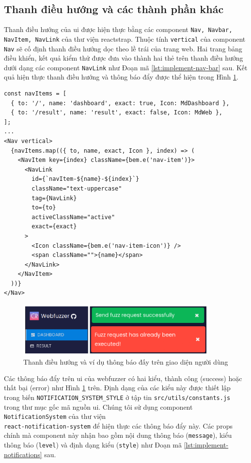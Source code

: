\subsection{Thanh điều hướng và các thành phần khác}
Thanh điều hướng của \acrshort{ui} được hiện thực bằng các component \texttt{Nav, Navbar, NavItem, NavLink} của thư viện reactstrap. Thuộc tính \texttt{vertical} của component \texttt{Nav} sẽ cố định thanh điều hướng dọc theo lề trái của trang web. Hai trang bảng điều khiển, kết quả kiểm thử được đưa vào thành hai thẻ trên thanh điều hướng dưới dạng các component \texttt{NavLink} như Đoạn mã \ref{lst:implement-nav-bar} sau. Kết quả hiện thực thanh điều hướng và thông báo đẩy được thể hiện trong Hình \ref{fig:notification-example}.
\begin{lstlisting}[style=ES6, label={lst:implement-nav-bar}, caption={Các thuộc tính props truyền vào component Nav}]
const navItems = [
  { to: '/', name: 'dashboard', exact: true, Icon: MdDashboard },
  { to: '/result', name: 'result', exact: false, Icon: MdWeb },
];
...
<Nav vertical>
  {navItems.map(({ to, name, exact, Icon }, index) => (
    <NavItem key={index} className={bem.e('nav-item')}>
      <NavLink
        id={`navItem-${name}-${index}`}
        className="text-uppercase"
        tag={NavLink}
        to={to}
        activeClassName="active"
        exact={exact}
      >
        <Icon className={bem.e('nav-item-icon')} />
        <span className="">{name}</span>
      </NavLink>
    </NavItem>
  ))}
</Nav>
\end{lstlisting}
\begin{figure}[H]
  \centering
    \includegraphics[width=0.9\textwidth,keepaspectratio=true]{images/notification-example.png}
  \caption{Thanh điều hướng và ví dụ thông báo đấy trên giao diện người dùng}
  \label{fig:notification-example}
\end{figure}
Các thông báo đẩy trên \acrshort{ui} của webfuzzer có hai kiểu, thành công (success) hoặc thất bại (error) như Hình \ref{fig:notification-example} trên. Định dạng của các kiểu này được thiết lập trong biến \texttt{NOTIFICATION\_SYSTEM\_STYLE} ở tập tin \texttt{src/utils/constants.js} trong thư mục gốc mã nguồn \acrshort{ui}. Chúng tôi sử dụng component \texttt{NotificationSystem} của thư viện\\\texttt{react-notification-system} để hiện thực các thông báo đẩy này. Các props chính mà component này nhận bao gồm nội dung thông báo (\texttt{message}), kiểu thông báo (\texttt{level}) và định dạng kiểu (\texttt{style}) như Đoạn mã \ref{lst:implement-notifications} sau.
